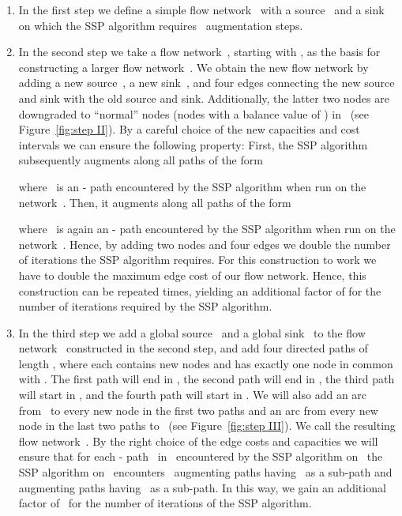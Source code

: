 \documentclass[11pt]{article}
\begin{document}
\begin{enumerate}
\item In the first step we define a simple flow network~ with a source~ and a sink~ on which the SSP algorithm requires~ augmentation steps. 

\item In the second step we take a flow network~, starting with , as the basis for constructing a larger flow network~. We obtain the new flow network by adding a new source~, a new sink~, and four edges connecting the new source and sink with the old source and sink. Additionally, the latter two nodes are downgraded to ``normal'' nodes (nodes with a balance value of ) in~ (see Figure~\ref{fig:step II}). By a careful choice of the new capacities and cost intervals we can ensure the following property: First, the SSP algorithm subsequently augments along all paths of the form

where~ is an - path encountered by the SSP algorithm when run on the network~. Then, it augments along all paths of the form

where~ is again an - path encountered by the SSP algorithm when run on the network~. Hence, by adding two nodes and four edges we double the number of iterations the SSP algorithm requires. For this construction to work we have to double the maximum edge cost of our flow network. Hence, this construction can be repeated  times, yielding an additional factor of  for the number of iterations required by the SSP algorithm.

\item In the third step we add a global source~ and a global sink~ to the flow network~ constructed in the second step, and add four directed paths of length , where each contains  new nodes and has exactly one node in common with .
The first path will end in , the second path will end in , the third path will start in , and the fourth path will start in . We will also add an arc from~ to every new node in the first two paths and an arc from every new node in the last two paths to~ (see Figure~\ref{fig:step III}). We call the resulting flow network~. By the right choice of the edge costs and capacities we will ensure that for each - path~ in~ encountered by the SSP algorithm on~ the SSP algorithm on~ encounters~ augmenting paths having~ as a sub-path and~ augmenting paths having~ as a sub-path. In this way, we gain an additional factor of~ for the number of iterations of the SSP algorithm.
\end{enumerate}
\end{document}
